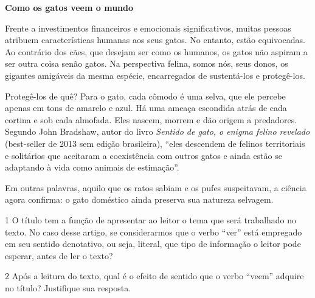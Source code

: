 \begin{myquote}
\begin{center}
\textbf{Como os gatos veem o mundo}
\end{center}

\noindent Frente a investimentos financeiros e emocionais significativos, muitas
pessoas atribuem características humanas aos seus gatos. No entanto,
estão equivocadas. Ao contrário dos cães, que desejam ser como os
humanos, os gatos não aspiram a ser outra coisa senão gatos. Na
perspectiva felina, somos nós, seus donos, os gigantes amigáveis da
mesma espécie, encarregados de sustentá-los e protegê-los.

Protegê-los de quê? Para o gato, cada cômodo é uma selva, que ele
percebe apenas em tons de amarelo e azul. Há uma ameaça escondida atrás
de cada cortina e sob cada almofada. Eles nascem, morrem e dão origem a
predadores. Segundo John Bradshaw, autor do livro \emph{Sentido de gato, o
enigma felino revelado} (best-seller de 2013 sem edição brasileira),
``eles descendem de felinos territoriais e solitários que aceitaram a
coexistência com outros gatos e ainda estão se adaptando à vida como
animais de estimação''.

Em outras palavras, aquilo que os ratos sabiam e os pufes suspeitavam, a
ciência agora confirma: o gato doméstico ainda preserva sua natureza
selvagem.

\end{myquote}

\num{1} O título tem a função de apresentar ao leitor o tema que será
trabalhado no texto. No caso desse artigo, se considerarmos que o verbo
``ver'' está empregado em seu sentido denotativo, ou seja, literal, que
tipo de informação o leitor pode esperar, antes de ler o texto?


\pagebreak

\num{2} Após a leitura do texto, qual é o efeito de sentido que o verbo
``veem'' adquire no título? Justifique sua resposta.


